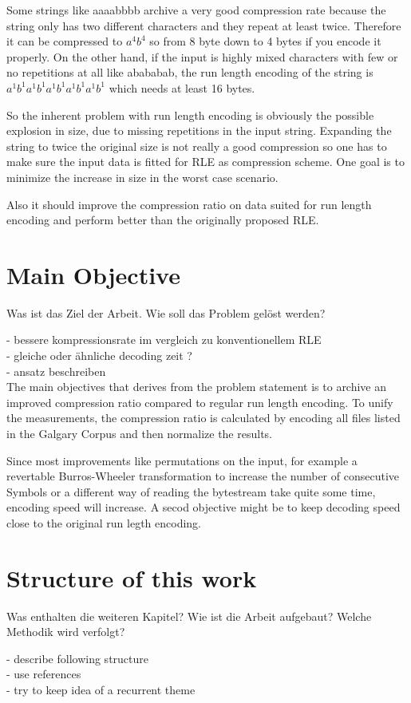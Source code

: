Some strings like aaaabbbb archive a very good compression rate because the string only has two different characters and they repeat at least twice. Therefore it can be compressed to $a^4b^4$ so from 8 byte down to 4 bytes if you encode it properly. On the other hand, if the input is highly mixed characters with few or no repetitions at all like abababab, the run length encoding of the string is $a^1b^1a^1b^1a^1b^1a^1b^1a^1b^1$ which needs at least 16 bytes. \par
So the inherent problem with run length encoding is obviously the possible explosion in size, due to missing repetitions in the input string. Expanding the string to twice the original size is not really a good compression so one has to make sure the input data is fitted for RLE as compression scheme. One goal is to minimize the increase in size in the worst case scenario. \par
Also it should improve the compression ratio on data suited for run length encoding and perform better than the originally proposed RLE.

\section{Main Objective}
\label{ch:Introduction:sec:Main Objective}

Was ist das Ziel der Arbeit. Wie soll das Problem gelöst werden?

- bessere kompressionsrate im vergleich zu konventionellem RLE\\
- gleiche oder ähnliche decoding zeit ?\\
- ansatz beschreiben\\

The main objectives that derives from the problem statement is to archive an improved compression ratio compared to regular run length encoding. To unify the measurements, the compression ratio is calculated by encoding all files listed in the Galgary Corpus and then normalize the results. \par
Since most improvements like permutations on the input, for example a revertable Burros-Wheeler transformation to increase the number of consecutive Symbols or a different way of reading the bytestream take quite some time, encoding speed will increase. A secod objective might be to keep decoding speed close to the original run legth encoding.

\section{Structure of this work}
\label{ch:Intoduction:sec:Structure}

Was enthalten die weiteren Kapitel? Wie ist die Arbeit aufgebaut? Welche Methodik wird verfolgt?

- describe following structure\\
- use references\\
- try to keep idea of a recurrent theme\\

